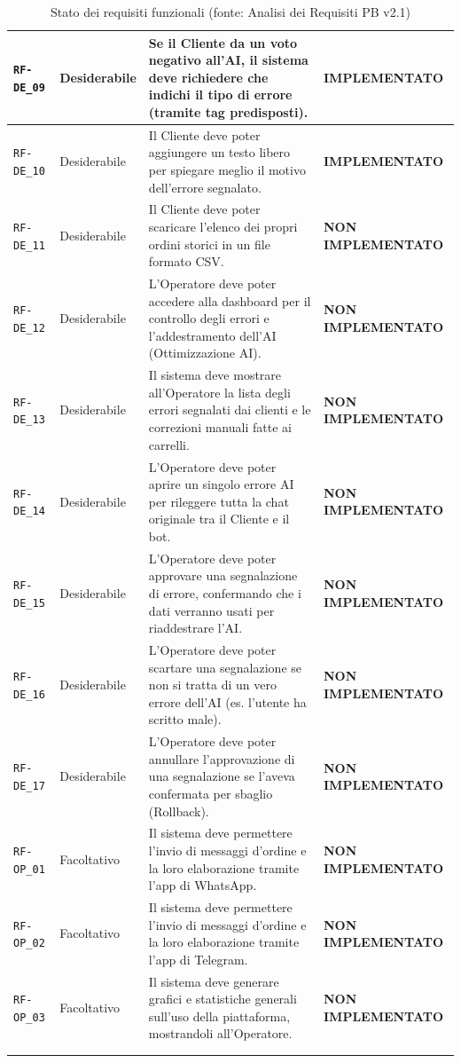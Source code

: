 \documentclass[a4paper, 11pt, oneside]{scrartcl}
\begin{document}
\begin{longtable}{|>{\raggedright\arraybackslash}p{}|>{\raggedright\arraybackslash}p{}|>{\raggedright\arraybackslash}p{}|>{\raggedright\arraybackslash}p{}|}
    \hline
    \texttt{RF-DE\_09} & Desiderabile & Se il Cliente da un voto negativo all'AI, il sistema deve richiedere che indichi il tipo di errore (tramite tag predisposti). & \textbf{IMPLEMENTATO} \\
    \hline
    \texttt{RF-DE\_10} & Desiderabile & Il Cliente deve poter aggiungere un testo libero per spiegare meglio il motivo dell'errore segnalato. & \textbf{IMPLEMENTATO} \\
    \hline
    \texttt{RF-DE\_11} & Desiderabile & Il Cliente deve poter scaricare l'elenco dei propri ordini storici in un file formato CSV. & \textbf{NON IMPLEMENTATO} \\
    \hline
    \texttt{RF-DE\_12} & Desiderabile & L'Operatore deve poter accedere alla dashboard per il controllo degli errori e l'addestramento dell'AI (Ottimizzazione AI). & \textbf{NON IMPLEMENTATO} \\
    \hline
    \texttt{RF-DE\_13} & Desiderabile & Il sistema deve mostrare all'Operatore la lista degli errori segnalati dai clienti e le correzioni manuali fatte ai carrelli. & \textbf{NON IMPLEMENTATO} \\
    \hline
    \texttt{RF-DE\_14} & Desiderabile & L'Operatore deve poter aprire un singolo errore AI per rileggere tutta la chat originale tra il Cliente e il bot. & \textbf{NON IMPLEMENTATO} \\
    \hline
    \texttt{RF-DE\_15} & Desiderabile & L'Operatore deve poter approvare una segnalazione di errore, confermando che i dati verranno usati per riaddestrare l'AI. & \textbf{NON IMPLEMENTATO} \\
    \hline
    \texttt{RF-DE\_16} & Desiderabile & L'Operatore deve poter scartare una segnalazione se non si tratta di un vero errore dell'AI (es. l'utente ha scritto male). & \textbf{NON IMPLEMENTATO} \\
    \hline
    \texttt{RF-DE\_17} & Desiderabile & L'Operatore deve poter annullare l'approvazione di una segnalazione se l'aveva confermata per sbaglio (Rollback). & \textbf{NON IMPLEMENTATO} \\
    \texttt{RF-OP\_01} & Facoltativo & Il sistema deve permettere l'invio di messaggi d'ordine e la loro elaborazione tramite l'app di WhatsApp. & \textbf{NON IMPLEMENTATO} \\
    \hline
    \texttt{RF-OP\_02} & Facoltativo & Il sistema deve permettere l'invio di messaggi d'ordine e la loro elaborazione tramite l'app di Telegram. & \textbf{NON IMPLEMENTATO} \\
    \hline
    \texttt{RF-OP\_03} & Facoltativo & Il sistema deve generare grafici e statistiche generali sull'uso della piattaforma, mostrandoli all'Operatore. & \textbf{NON IMPLEMENTATO} \\
    \hline
    \multicolumn{4}{c}{} \\
    \caption{Stato dei requisiti funzionali (fonte: Analisi dei Requisiti PB v2.1)}\label{tab:stato_requisiti_funzionali}
\end{longtable}
\end{document}
